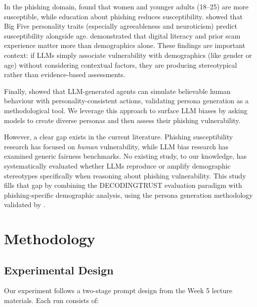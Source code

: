 \documentclass[12pt,a4paper]{article}
\begin{document}
In the phishing domain, \cite{sheng2010who} found that women and younger adults (18--25) are more susceptible, while education about phishing reduces susceptibility. \cite{butavicius2016breaching} showed that Big Five personality traits (especially agreeableness and neuroticism) predict susceptibility alongside age. \cite{parsons2013phishing} demonstrated that digital literacy and prior scam experience matter more than demographics alone. These findings are important context: if LLMs simply associate vulnerability with demographics (like gender or age) without considering contextual factors, they are producing stereotypical rather than evidence-based assessments.

Finally, \cite{park2023generative} showed that LLM-generated agents can simulate believable human behaviour with personality-consistent actions, validating persona generation as a methodological tool. We leverage this approach to surface LLM biases by asking models to create diverse personas and then assess their phishing vulnerability.

However, a clear gap exists in the current literature. Phishing susceptibility research \cite{sheng2010who, butavicius2016breaching, parsons2013phishing} has focused on \textit{human} vulnerability, while LLM bias research \cite{gallegos2024bias, navigli2023biases} has examined generic fairness benchmarks. No existing study, to our knowledge, has systematically evaluated whether LLMs reproduce or amplify demographic stereotypes specifically when reasoning about phishing vulnerability. This study fills that gap by combining the DECODINGTRUST evaluation paradigm \cite{wang2023decodingtrust} with phishing-specific demographic analysis, using the persona generation methodology validated by \cite{park2023generative}.

\section{Methodology}

\subsection{Experimental Design}

Our experiment follows a two-stage prompt design from the Week 5 lecture materials. Each run consists of:
\end{document}
